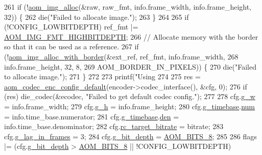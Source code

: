 \begin{DoxyCodeInclude}
{{{{{{{261   \textcolor{keywordflow}{if} (!\hyperlink{aom__image_8h_a570db29fbd122951235a08fe9375f6bb}{aom\_img\_alloc}(&raw, raw\_fmt, info.frame\_width, info.frame\_height, 32)) \{
262     die(\textcolor{stringliteral}{"Failed to allocate image."});
263   \}
264 
265   \textcolor{keywordflow}{if} (!CONFIG\_LOWBITDEPTH) ref\_fmt |= \hyperlink{aom__image_8h_a607b37d91f75442f54223ecd85f1b6cb}{AOM\_IMG\_FMT\_HIGHBITDEPTH};
266   \textcolor{comment}{// Allocate memory with the border so that it can be used as a reference.}
267   \textcolor{keywordflow}{if} (!\hyperlink{aom__image_8h_aeb211e5184687f7e10d7c5bed4dcfdcd}{aom\_img\_alloc\_with\_border}(&ext\_ref, ref\_fmt, info.frame\_width,
268                                  info.frame\_height, 32, 8,
269                                  AOM\_BORDER\_IN\_PIXELS)) \{
270     die(\textcolor{stringliteral}{"Failed to allocate image."});
271   \}
272 
273   printf(\textcolor{stringliteral}{"Using %
274 
275   res = \hyperlink{group__encoder_gabe456ab6f99bdebc47018779b75d2521}{aom\_codec\_enc\_config\_default}(encoder->codec\_interface(), &cfg, 0);
276   \textcolor{keywordflow}{if} (res) die\_codec(&ecodec, \textcolor{stringliteral}{"Failed to get default codec config."});
277 
278   cfg.\hyperlink{structaom__codec__enc__cfg_a80cb459c5ef3c7e1516f617c4c9d6eab}{g\_w} = info.frame\_width;
279   cfg.\hyperlink{structaom__codec__enc__cfg_a37b0f57b63bec8d133df8901d4407ee6}{g\_h} = info.frame\_height;
280   cfg.\hyperlink{structaom__codec__enc__cfg_a10664f1fc5b6ec29b77ee13efeeecdf7}{g\_timebase}.\hyperlink{structaom__rational_a7b48174411798c780a15f132c4650839}{num} = info.time\_base.numerator;
281   cfg.\hyperlink{structaom__codec__enc__cfg_a10664f1fc5b6ec29b77ee13efeeecdf7}{g\_timebase}.\hyperlink{structaom__rational_adeddf2ea01c12b7be66536e0a0fb92c5}{den} = info.time\_base.denominator;
282   cfg.\hyperlink{structaom__codec__enc__cfg_ab21539da477dba7506d90353c27d218b}{rc\_target\_bitrate} = bitrate;
283   cfg.\hyperlink{structaom__codec__enc__cfg_a614a49318f2011cc8735d7e51b910fa4}{g\_lag\_in\_frames} = 3;
284   cfg.\hyperlink{structaom__codec__enc__cfg_a76a27f44cded1516803a776a0a7e9038}{g\_bit\_depth} = \hyperlink{group__codec_gga6ed0e98eba4651c1ad845e39498e4153a4c7f55539160206a3fbb2a6cfc9ef89c}{AOM\_BITS\_8};
285 
286   flags |= (cfg.\hyperlink{structaom__codec__enc__cfg_a76a27f44cded1516803a776a0a7e9038}{g\_bit\_depth} > \hyperlink{group__codec_gga6ed0e98eba4651c1ad845e39498e4153a4c7f55539160206a3fbb2a6cfc9ef89c}{AOM\_BITS\_8} || !CONFIG\_LOWBITDEPTH)
}}}}}}}}
\end{DoxyCodeInclude}
